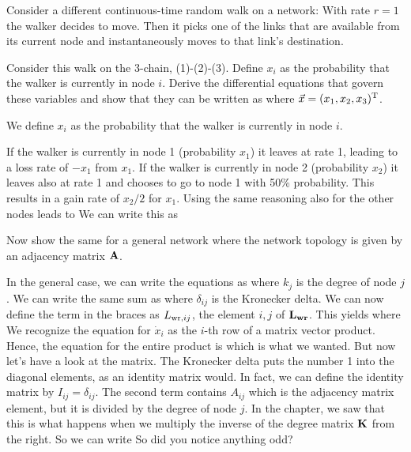 Consider a different continuous-time random walk on a network: With rate $r = 1$ the walker decides to move. Then it picks one of the links that are available from its current node and instantaneously moves to that link's destination. 

\subquestion Consider this walk on the 3-chain, (1)-(2)-(3). Define $x_i$ as the probability that the walker is currently in node $i$. Derive the differential equations that govern these variables and show that they can be written as
where $\vec{x}=(x_1,x_2,x_3)^{\rm T}$.

\solution
We define $x_i$ as the probability that the walker is currently in node $i$. 

If the walker is currently in node 1 (probability $x_1$) it leaves at rate 1, leading to a loss rate of $-x_1$ from $x_1$. If the walker is currently in node 2 (probability $x_2$) it leaves also at rate 1 and chooses to go to node 1 with 50\% probability. This results in a gain rate of $x_2/2$ for $x_1$. Using the same reasoning also for the other nodes leads to  
We can write this as 

\subquestion 
Now show the same for a general network where the network topology is given by an adjacency matrix $\bf A$. 

\solution 
In the general case, we can write the equations as 
where $k_j$ is the degree of node $j$. We can write the same sum as 
where $\delta_{ij}$ is the Kronecker delta. We can now define the term in the braces as $L_{{\rm wr},ij}$, the element $i,j$ of $\bf L_{wr}$. This yields 
where 
We recognize the equation for $\dot{x}_i$ as the $i$-th row of a matrix vector product. Hence, the equation for the entire product is
which is what we wanted. But now let's have a look at the matrix. The Kronecker delta puts the number 1 into the diagonal elements, as an identity matrix would. In fact, we can define the identity matrix by $I_{ij}=\delta_{ij}$. The second term contains $A_{ij}$ which is the adjacency matrix element, but it is divided by the degree of node $j$. In the chapter, we saw that this is what happens when we multiply the inverse of the degree matrix $\bf K$ from the right. So we can write
So did you notice anything odd? 

